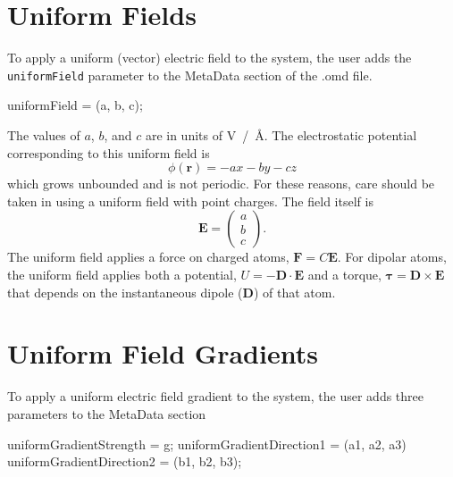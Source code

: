 \documentclass[letterpaper]{report}
\begin{document}
\section{\label{sec:UniformField}Uniform Fields} 
To apply a uniform
(vector) electric field to the system, the user adds the {\tt
  uniformField} parameter to the MetaData section of the .omd file.

\begin{code}[caption={Specifying a uniform electric field.},label={sch:uniformField}]
   uniformField = (a, b, c);  
\end{code}

The values of $a$, $b$, and $c$ are in units of V~/~\AA.  The
electrostatic potential corresponding to this uniform field is
\begin{equation}
\phi(\mathbf{r})  = - a x - b y - c z
\end{equation}
which grows unbounded and is not periodic.  For these reasons, care
should be taken in using a uniform field with point charges.
The field itself is 
\begin{equation}
\mathbf{E} = \left( \begin{array}{c} a \\ b \\ c \end{array} \right).
\end{equation}
The uniform field applies a force on charged atoms, $ \mathbf{F} = C
\mathbf{E}$.  For dipolar atoms, the uniform field applies both a
potential, $ U = - \mathbf{D} \cdot \mathbf{E}$ and a torque, $
\mathbf{\tau} = \mathbf{D} \times \mathbf{E}$ that depends on the
instantaneous dipole ($\mathbf{D}$) of that atom.

\section{\label{sec:UniformGradient}Uniform Field Gradients} 
To apply a uniform electric field gradient to the system, the user
adds three parameters to the MetaData section

\begin{code}[caption={Specifying a uniform electric field gradient.},label={sch:uniformFieldGradient}]
    uniformGradientStrength = g;
    uniformGradientDirection1 = (a1, a2, a3)
    uniformGradientDirection2 = (b1, b2, b3);
\end{code}
\end{document}
